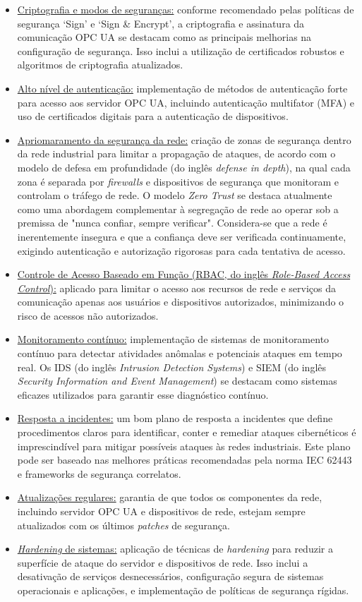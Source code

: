     \begin{itemize}
        \item \underline{Criptografia e modos de seguranças:} conforme recomendado pelas políticas de segurança `Sign' e `Sign \& Encrypt', a criptografia e assinatura da comunicação OPC UA se destacam como as principais melhorias na configuração de segurança. Isso inclui a utilização de certificados robustos e algoritmos de criptografia atualizados.
        \item \underline{Alto nível de autenticação:} implementação de métodos de autenticação forte para acesso aos servidor OPC UA, incluindo autenticação multifator (MFA) e uso de certificados digitais para a autenticação de dispositivos.
        \item \underline{Apriomaramento da segurança da rede:} criação de zonas de segurança dentro da rede industrial para limitar a propagação de ataques, de acordo com o modelo de defesa em profundidade (do inglês \textit{defense in depth}), na qual cada zona é separada por \textit{firewalls} e dispositivos de segurança que monitoram e controlam o tráfego de rede. O modelo \textit{Zero Trust} se destaca atualmente como uma abordagem complementar à segregação de rede ao operar sob a premissa de "nunca confiar, sempre verificar". Considera-se que a rede é inerentemente insegura e que a confiança deve ser verificada continuamente, exigindo autenticação e autorização rigorosas para cada tentativa de acesso. 
        \item \underline{Controle de Acesso Baseado em Função (RBAC, do inglês \textit{Role-Based Access Control}):} aplicado para limitar o acesso aos recursos de rede e serviços da comunicação apenas aos usuários e dispositivos autorizados, minimizando o risco de acessos não autorizados.
        \item \underline{Monitoramento contínuo:} implementação de sistemas de monitoramento contínuo para detectar atividades anômalas e potenciais ataques em tempo real. Os IDS (do inglês \textit{Intrusion Detection Systems}) e SIEM (do inglês \textit{Security Information and Event Management}) se destacam como sistemas eficazes utilizados para garantir esse diagnóstico contínuo.
        \item \underline{Resposta a incidentes:} um bom plano de resposta a incidentes que define procedimentos claros para identificar, conter e remediar ataques cibernéticos é imprescindível para mitigar possíveis ataques às redes industriais. Este plano pode ser baseado nas melhores práticas recomendadas pela norma IEC 62443 e frameworks de segurança correlatos.
        \item \underline{Atualizações regulares:} garantia de que todos os componentes da rede, incluindo servidor OPC UA e dispositivos de rede, estejam sempre atualizados com os últimos \textit{patches} de segurança.
        \item \underline{\textit{Hardening} de sistemas:} aplicação de técnicas de \textit{hardening} para reduzir a superfície de ataque do servidor e dispositivos de rede. Isso inclui a desativação de serviços desnecessários, configuração segura de sistemas operacionais e aplicações, e implementação de políticas de segurança rígidas.
    \end{itemize}

